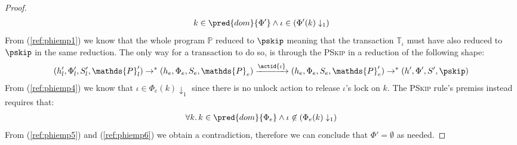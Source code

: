 \begin{lem}
{\begin{proof}
		\begin{gather}
			\label{ref:phiemp4}
			k \in \pred{dom}{\Phi'} \land \iota \in \left( \Phi'(k) \downarrow_1 \right)
		\end{gather}
		From (\ref{ref:phiemp1}) we know that the whole program $\mathds{P}$ reduced to $\pskip$ meaning that the transaction $\mathds{T}_\iota$ must have also reduced to $\pskip$ in the same reduction. The only way for a transaction to do so, is through the \textsc{PSkip} in a reduction of the following shape:
		\begin{gather}
			\label{ref:phiemp5}
			(h_l', \Phi_l', S_l', \mathds{P}_l')
				\rightarrow^*
			(h_e, \Phi_e, S_e, \mathds{P}_e)
				\xrightarrow{\actid{\iota}}
			(h_e, \Phi_e, S_e, \mathds{P}_e')
				\rightarrow^*
			(h', \Phi', S', \pskip)
		\end{gather}		
		 From (\ref{ref:phiemp4}) we know that $\iota \in \Phi_e(k) \downarrow_1$ since there is no unlock action to release $\iota$'s lock on $k$. The \textsc{PSkip} rule's premiss instead requires that:
		\begin{gather}
			\label{ref:phiemp6}
			\forall k \ldotp k \in \pred{dom}{\Phi_e} \land \iota \not\in \left( \Phi_e(k) \downarrow_1 \right)
		\end{gather}
		From (\ref{ref:phiemp5}) and (\ref{ref:phiemp6}) we obtain a contradiction, therefore we can conclude that $\Phi' = \emptyset$ as needed.
	\end{proof}
	}
\end{lem}

